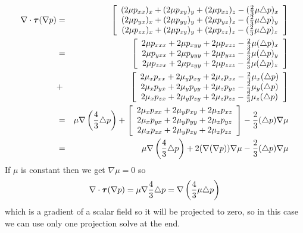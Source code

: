 \documentclass{article}
\renewcommand{\vec}[1]{\hbox{\boldmath $#1$}}
\begin{document}
\begin{eqnarray*} \nabla\cdot \vec{\tau}(\nabla p) &=&  \left[
\begin{array}{c}
(2\mu p_{xx})_x + (2\mu p_{xy})_y +(2\mu p_{xz})_z - (\frac{2}{3} \mu \triangle p)_x  \\
(2\mu p_{yx})_x + (2\mu p_{yy})_y  + (2\mu p_{yz})_z - (\frac{2}{3}\mu \triangle p)_y\\
(2\mu p_{zx})_x + (2 \mu p_{zy})_y + (2\mu p_{zz})_z - (\frac{2}{3}\mu \triangle p)_z\\
\end{array}
\right] \\
&=& \left[ 
\begin{array}{c}
2\mu p_{xxx} + 2\mu p_{xyy} + 2\mu p_{xzz} - \frac{2}{3} \mu (\triangle p)_x  \\
2\mu p_{yxx} + 2\mu p_{yyy} + 2\mu p_{yzz} - \frac{2}{3}\mu (\triangle p)_y\\
2\mu p_{zxx} + 2\mu p_{zyy} + 2\mu p_{zzz} - \frac{2}{3}\mu (\triangle p)_z\\
\end{array}
\right]
\\
&+& \left[ 
\begin{array}{c}
2\mu_x p_{xx} + 2\mu_y p_{xy} + 2\mu_z p_{xz} - \frac{2}{3} \mu_x (\triangle p)  \\
2\mu_x p_{yx} + 2\mu_y p_{yy} + 2\mu_z p_{yz} - \frac{2}{3}\mu_y (\triangle p)\\
2\mu_x p_{zx} + 2\mu_y p_{zy} + 2\mu_z p_{zz} - \frac{2}{3}\mu_z (\triangle p)\\
\end{array}
\right]\\
&=& 
\mu\nabla\left(\frac{4}{3}\triangle p \right) +
\left[ 
\begin{array}{c}
2\mu_x p_{xx} + 2\mu_y p_{xy} + 2\mu_z p_{xz}  \\
2\mu_x p_{yx} + 2\mu_y p_{yy} + 2\mu_z p_{yz}\\
2\mu_x p_{zx} + 2\mu_y p_{zy} + 2\mu_z p_{zz}\\
\end{array}
\right] - \frac{2}{3}(\triangle p)  \nabla\mu \\
&=& 
\mu\nabla\left(\frac{4}{3}\triangle p \right) +
2(\nabla (\nabla p))\nabla \mu
 - \frac{2}{3}(\triangle p)  \nabla\mu \\
\end{eqnarray*}
If $\mu$ is constant then we get $\nabla\mu=0$ so 
$$\nabla\cdot\vec{\tau}(\nabla p)=\mu \nabla \frac{4}{3}  \triangle p = \nabla \left( \frac{4}{3} \mu  \triangle p \right)  $$
which is a gradient of a scalar field so it will be projected to zero, so in this case we can use only one projection solve at the end.
\end{document}
